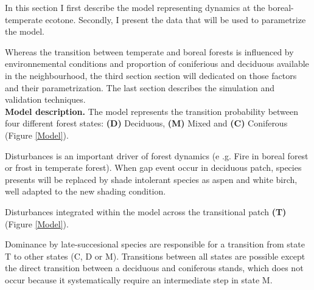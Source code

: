 In this section I first describe the  model representing dynamics at the
boreal-temperate ecotone. Secondly, I present the  data that will be used to
parametrize the model.


Whereas the transition between temperate and boreal forests is influenced by
environnemental conditions and proportion of coniferious and deciduous
available in the neighbourhood, the third section section will dedicated on
those factors and their parametrization. The last section describes the
simulation and validation techniques.\\


\textbf{Model description.} The model represents the transition probability
between four different forest states: \textbf{(D)} Deciduous, \textbf{(M)}
Mixed and \textbf{(C)} Coniferous (Figure \ref{Model}).


Disturbances is an important driver of forest dynamics (e .g. Fire in boreal
forest or frost in temperate forest). When gap event occur in deciduous patch,
species presents will be replaced by shade intolerant species as aspen and
white birch, well adapted to the new shading condition.


Disturbances  integrated within the model across the transitional patch
\textbf{(T)} (Figure \ref{Model}).


Dominance by late-succesional species are responsible for a transition from
state T to other states (C, D or M). Transitions between all states are
possible  except the direct transition between a deciduous and coniferous
stands, which does not occur because it systematically require an intermediate
step in state M.

